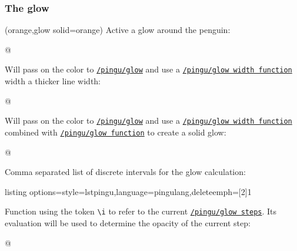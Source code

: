 \documentclass[parskip=half,english,numbers=noenddot,footnotes=nomultiple,oneside]{scrartcl}
\makeatletter
\def\lpingu#1{\lstinline[style=lstpingu,language=pingulang]'#1'}
\newcommand*\keyref[2][/pingu/]{\hyperref[pk:#1#2]{\lpingu{#1#2}}}
\edef\i{\number\count@}\relax
\makeatother
\begin{document}
\subsubsection{The glow}

(orange,glow solid=orange)
	Active a glow around the penguin:
\begin{tcblisting}{@}
\begin{tikzpicture}
	\pingu[glow=green]
\end{tikzpicture}
\end{tcblisting}
\endshowkeyexplain

Will pass on the color to \keyref{glow} and use a \keyref{glow width function} width a thicker line width:
\begin{tcblisting}{@}
\begin{tikzpicture}
	\pingu[glow thick=green]
\end{tikzpicture}
\end{tcblisting}
\endkeyexplain

Will pass on the color to \keyref{glow} and use a \keyref{glow width function} combined with \keyref{glow function} to create a solid glow:
\begin{tcblisting}{@}
\begin{tikzpicture}
	\pingu[glow solid=green, wings wave]
\end{tikzpicture}
\end{tcblisting}
\endkeyexplain

	Comma separated list of discrete intervals for the glow calculation:
\begin{tcblisting}{listing options={style=lstpingu,language=pingulang,deleteemph={[2]{1}}}}
\begin{tikzpicture}
	\pingu[glow=green, glow steps={.3,.5,1}]
\end{tikzpicture}
\end{tcblisting}
\endsubkeyexplain

{\def\i{\textbackslash i~}%
	Function using the token \lpingu{\i} to refer to the current \keyref{glow steps}. Its evaluation will be used to determine the opacity of the current step:
\begin{tcblisting}{@}
\begin{tikzpicture}
	\pingu[glow=green,
	       glow function={.5/\i}]
\end{tikzpicture}
\end{tcblisting}
\endsubkeyexplain}
\end{document}
